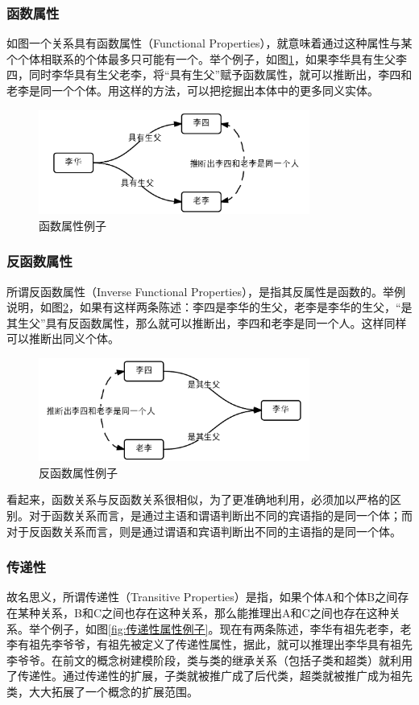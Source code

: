 \documentclass[12pt,a4paper]{article}
\begin{document}
		\subsubsection{函数属性}
	如图一个关系具有函数属性（Functional Properties），就意味着通过这种属性与某个个体相联系的个体最多只可能有一个。举个例子，如图\ref{fig:函数属性例子}，如果李华具有生父李四，同时李华具有生父老李，将“具有生父”赋予函数属性，就可以推断出，李四和老李是同一个个体。用这样的方法，可以把挖掘出本体中的更多同义实体。	
	\begin{figure}[htbp] 
	\centering\includegraphics[width=3.5in]{fig/functionalPropertyExample.png} 
	\caption{函数属性例子}\label{fig:函数属性例子} 
	\end{figure} 
	
		\subsubsection{反函数属性}
	所谓反函数属性（Inverse Functional Properties），是指其反属性是函数的。举例说明，如图\ref{fig:反函数属性例子}，如果有这样两条陈述：李四是李华的生父，老李是李华的生父，“是其生父”具有反函数属性，那么就可以推断出，李四和老李是同一个人。这样同样可以推断出同义个体。
	
	\begin{figure}[htbp] 
	\centering\includegraphics[width=3.5in]{fig/inverseFunctionalPropertyExample.png} 
	\caption{反函数属性例子}\label{fig:反函数属性例子} 
	\end{figure} 
	
	看起来，函数关系与反函数关系很相似，为了更准确地利用，必须加以严格的区别。对于函数关系而言，是通过主语和谓语判断出不同的宾语指的是同一个体；而对于反函数关系而言，则是通过谓语和宾语判断出不同的主语指的是同一个体。
		
		\subsubsection{传递性}
	故名思义，所谓传递性（Transitive Properties）是指，如果个体A和个体B之间存在某种关系，B和C之间也存在这种关系，那么能推理出A和C之间也存在这种关系。举个例子，如图\ref{fig:传递性属性例子}。现在有两条陈述，李华有祖先老李，老李有祖先李爷爷，有祖先被定义了传递性属性，据此，就可以推理出李华具有祖先李爷爷。在前文的概念树建模阶段，类与类的继承关系（包括子类和超类）就利用了传递性。通过传递性的扩展，子类就被推广成了后代类，超类就被推广成为祖先类，大大拓展了一个概念的扩展范围。
		
\end{document}
